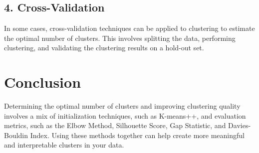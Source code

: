 \documentclass{article}
\begin{document}
\subsection{4. Cross-Validation}
In some cases, cross-validation techniques can be applied to clustering to estimate the optimal number of clusters. This involves splitting the data, performing clustering, and validating the clustering results on a hold-out set.

\section{Conclusion}

Determining the optimal number of clusters and improving clustering quality involves a mix of initialization techniques, such as K-means++, and evaluation metrics, such as the Elbow Method, Silhouette Score, Gap Statistic, and Davies-Bouldin Index. Using these methods together can help create more meaningful and interpretable clusters in your data.
 
\end{document}
